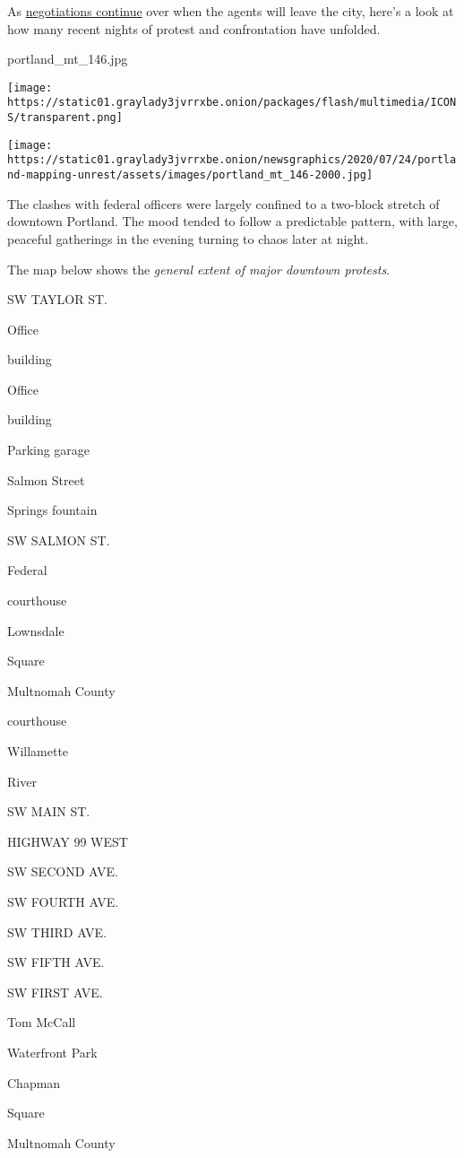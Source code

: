 As
\href{https://www.nytimes3xbfgragh.onion/2020/07/29/us/protests-portland-federal-withdrawal.html}{negotiations
continue} over when the agents will leave the city, here's a look at how
many recent nights of protest and confrontation have unfolded.

portland\_mt\_146.jpg

\texttt{[image: https://static01.graylady3jvrrxbe.onion/packages/flash/multimedia/ICONS/transparent.png]}

\texttt{[image: https://static01.graylady3jvrrxbe.onion/newsgraphics/2020/07/24/portland-mapping-unrest/assets/images/portland\_mt\_146-2000.jpg]}

The clashes with federal officers were largely confined to a two-block
stretch of downtown Portland. The mood tended to follow a predictable
pattern, with large, peaceful gatherings in the evening turning to chaos
later at night.

The map below shows the \emph{general extent of major downtown
protests}.

SW TAYLOR ST.

Office

building

Office

building

Parking garage

Salmon Street

Springs fountain

SW SALMON ST.

Federal

courthouse

Lownsdale

Square

Multnomah County

courthouse

Willamette

River

SW MAIN ST.

HIGHWAY 99 WEST

SW SECOND AVE.

SW FOURTH AVE.

SW THIRD AVE.

SW FIFTH AVE.

SW FIRST AVE.

Tom McCall

Waterfront Park

Chapman

Square

Multnomah County

